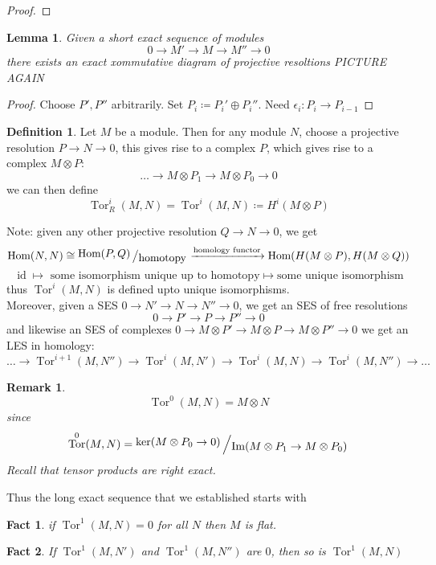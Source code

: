 \documentclass[12pt]{article}
\newcommand{\ho}[2]{\textup{Hom}(#1,#2)}
\DeclareMathOperator{\Im}{Im}
\DeclareMathOperator{\id}{id}
\DeclareMathOperator{\Tor}{Tor}
\newcommand{\bigslant}[2]{{\raisebox{.2em}{$#1$}\left/\raisebox{-.2em}{$#2$}\right.}}
\newtheorem{lemma}[theorem]{Lemma}
\newtheorem{remark}[theorem]{Remark}
\newtheorem*{fact}{Fact}
\theoremstyle{definition}
\newtheorem{definition}[theorem]{Definition}
\begin{document}
\begin{proof}

\end{proof}
\begin{lemma}
Given a short exact sequence of  modules
\[
0 \rightarrow M' \rightarrow M \rightarrow M'' \rightarrow 0
\]
there exists an exact xommutative diagram of projective resoltions 
PICTURE AGAIN
\end{lemma}
\begin{proof}
Choose $P',P''$ arbitrarily. Set $P_i \coloneqq P_i' \oplus P_i''$. Need $\epsilon_i: P_i \rightarrow P_{i-1}$
\end{proof}
\begin{definition}
Let $M$ be a module. Then for any module $N$, choose a projective resolution $P\rightarrow N \rightarrow 0$, this gives rise to a complex $P$, which gives rise to a complex $M \otimes P:$
\[
\dots \rightarrow M \otimes P_1 \rightarrow M \otimes P_0 \rightarrow 0
\]
we can then define
\[
\Tor_R^i(M,N) = \Tor^i(M,N) \coloneqq H^i(M \otimes P)
\]

\end{definition}
Note: given any other projective resolution $Q\rightarrow N \rightarrow 0$, we get
\[
\ho{N}{N} \cong \bigslant{\ho{P}{Q}}{\text{homotopy}} \xrightarrow{\text{homology functor}} \ho{H(M\otimes P)}{H(M\otimes Q)} 
\]
\[
\id \mapsto \text{ some isomorphism unique up to homotopy} \mapsto \text{some unique isomorphism}
\]
thus $\Tor^i(M,N)$ is defined upto unique isomorphisms.\\
Moreover, given a SES $0\rightarrow N' \rightarrow N \rightarrow N'' \rightarrow 0$, we get an SES of free resolutions
\[
0 \rightarrow P' \rightarrow P\rightarrow P'' \rightarrow 0
\]
and likewise an SES of complexes $0 \rightarrow M\otimes P' \rightarrow M \otimes P \rightarrow M\otimes P'' \rightarrow 0$ we get an LES in homology:
\[
\dots \rightarrow \Tor^{i+1}(M,N'') \rightarrow \Tor^i(M,N')\rightarrow \Tor^i(M,N) \rightarrow \Tor^i(M,N'') \rightarrow \dots
\]
\begin{remark}
\[
\Tor^0(M,N) = M\otimes N
\]
since 
\[
\Tor^0(M,N) = \bigslant{\ker(M \otimes P_0 \rightarrow 0)}{\Im(M\otimes P_1 \rightarrow M \otimes P_0)}
\]
Recall that tensor products are right exact.
\end{remark}
Thus the long exact sequence that we established starts with

\begin{fact}
if $\Tor^1(M,N) = 0$ for all $N$ then $M$ is flat.
\end{fact}
\begin{fact}
If $\Tor^1(M,N')$ and $\Tor^1(M,N'')$ are $0$, then so is $\Tor^1(M,N)$
\end{fact}
\date{20.11.2018}
\end{document}
